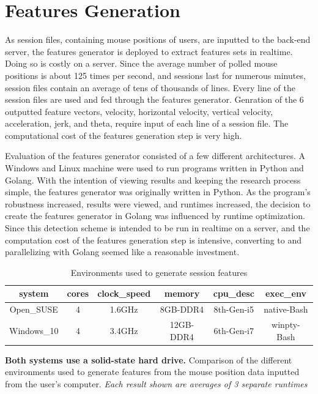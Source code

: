 
\section{Features Generation}\label{sec:evaluation-features-generation}
As session files, containing mouse positions of users, are inputted to the back-end server, the features generator is deployed to extract features sets in realtime. Doing so is costly on a server. Since the average number of polled mouse positions is about 125 times per second, and sessions last for numerous minutes, session files contain an average of tens of thousands of lines. Every line of the session files are used and fed through the features generator. Genration of the 6 outputted feature vectors, velocity, horizontal velocity, vertical velocity, acceleration, jerk, and theta, require input of each line of a session file. The computational cost of the features generation step is very high.

Evaluation of the features generator consisted of a few different architectures. A Windows and Linux machine were used to run programs written in Python and Golang. With the intention of viewing results and keeping the research process simple, the features generator was originally written in Python. As the program's robustness increased, results were viewed, and runtimes increased, the decision to create the features generator in Golang was influenced by runtime optimization. Since this detection scheme is intended to be run in realtime on a server, and the computation cost of the features generation step is intensive, converting to and parallelizing with Golang seemed like a reasonable investment.

\begin{table}[h!]
	\centering
	\begin{tabular}{ |c|c|c|c|c|c| }
		\hline
		\textbf{system} & \textbf{cores} & \textbf{clock{\_}speed} & \textbf{memory} & \textbf{cpu{\_}desc} & \textbf{exec{\_}env} \\
		\hline
		Open{\_}SUSE & 4 & 1.6GHz & 8GB-DDR4 & 8th-Gen-i5 & native-Bash \\
		Windows{\_}10 & 4 & 3.4GHz & 12GB-DDR4 & 6th-Gen-i7 & winpty-Bash \\
		\hline
	\end{tabular}
	\caption{Environments used to generate session features}
	{\small \textbf{Both systems use a solid-state hard drive.} Comparison of the different environments used to generate features from the mouse position data inputted from the user's computer. \textit{Each result shown are averages of 3 separate runtimes}}
\end{table}

